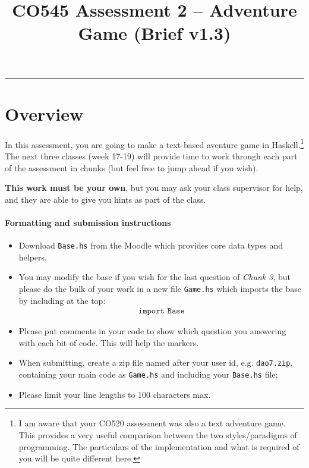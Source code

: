 \documentclass{article}
\date{}
\title{\vspace{-5em}CO545 Assessment 2 -- Adventure Game
{\footnotesize{(Brief v1.3)}}}
\begin{document}
\maketitle
\vspace{-5em}
\hrule
\vspace{1em}

\section{Overview}

In this assessment, you are going to make a text-based aventure game
in Haskell.\footnote{I am aware that your CO520 assessment was also a
  text adventure game. This provides a very useful comparison between
  the two styles/paradigms of programming. The particulars of the
  implementation and what is required of you will be quite different
  here. } The next three classes (week 17-19) will provide time
to work through each part of the assessment in chunks (but feel free
to jump ahead if you wish).

\textbf{This work must be your own}, but you may ask your class supervisor
for help, and they are able to give you hints as part of the class.

\paragraph{Formatting and submission instructions}
%
\begin{itemize}[itemsep=0.1em]
\item Download \texttt{Base.hs} from the Moodle which provides core
  data types and helpers.

\item You may modify the base if you wish for the last question of
  \textit{Chunk 3}, but please do the bulk of your work in a new file
  \texttt{Game.hs} which imports the base by including at the top:
%
\begin{align*}
\texttt{import Base}
\end{align*}
%

\item Please put comments in your code to show which question
you answering with each bit of code. This will help the markers.

\item When submitting, create a zip file named after your user id,
  e.g. \texttt{dao7.zip}, containing your main code as
  \texttt{Game.hs} and including your \texttt{Base.hs} file;

\item Please limit your line lengths to 100 characters max.
\end{itemize}
%
\end{document}
